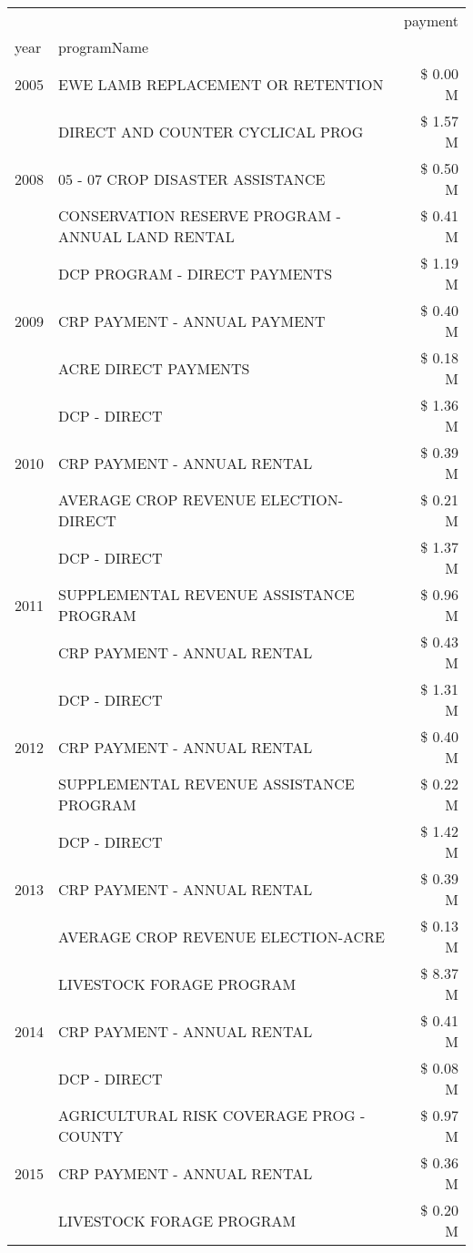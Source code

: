 \begin{tabular}{llr}
\toprule
 &  & payment \\
year & programName &  \\
\midrule
2005 & EWE LAMB REPLACEMENT OR RETENTION & \$ 0.00 M \\
\cline{1-3}
\multirow[t]{3}{*}{2008} & DIRECT AND COUNTER CYCLICAL PROG & \$ 1.57 M \\
 & 05 - 07 CROP DISASTER ASSISTANCE & \$ 0.50 M \\
 & CONSERVATION RESERVE PROGRAM - ANNUAL LAND RENTAL & \$ 0.41 M \\
\cline{1-3}
\multirow[t]{3}{*}{2009} & DCP PROGRAM - DIRECT PAYMENTS & \$ 1.19 M \\
 & CRP PAYMENT - ANNUAL PAYMENT & \$ 0.40 M \\
 & ACRE DIRECT PAYMENTS & \$ 0.18 M \\
\cline{1-3}
\multirow[t]{3}{*}{2010} & DCP - DIRECT & \$ 1.36 M \\
 & CRP PAYMENT - ANNUAL RENTAL & \$ 0.39 M \\
 & AVERAGE CROP REVENUE ELECTION-DIRECT & \$ 0.21 M \\
\cline{1-3}
\multirow[t]{3}{*}{2011} & DCP - DIRECT & \$ 1.37 M \\
 & SUPPLEMENTAL REVENUE ASSISTANCE PROGRAM & \$ 0.96 M \\
 & CRP PAYMENT - ANNUAL RENTAL & \$ 0.43 M \\
\cline{1-3}
\multirow[t]{3}{*}{2012} & DCP - DIRECT & \$ 1.31 M \\
 & CRP PAYMENT - ANNUAL RENTAL & \$ 0.40 M \\
 & SUPPLEMENTAL REVENUE ASSISTANCE PROGRAM & \$ 0.22 M \\
\cline{1-3}
\multirow[t]{3}{*}{2013} & DCP - DIRECT & \$ 1.42 M \\
 & CRP PAYMENT - ANNUAL RENTAL & \$ 0.39 M \\
 & AVERAGE CROP REVENUE ELECTION-ACRE & \$ 0.13 M \\
\cline{1-3}
\multirow[t]{3}{*}{2014} & LIVESTOCK FORAGE PROGRAM & \$ 8.37 M \\
 & CRP PAYMENT - ANNUAL RENTAL & \$ 0.41 M \\
 & DCP - DIRECT & \$ 0.08 M \\
\cline{1-3}
\multirow[t]{3}{*}{2015} & AGRICULTURAL RISK COVERAGE PROG - COUNTY & \$ 0.97 M \\
 & CRP PAYMENT - ANNUAL RENTAL & \$ 0.36 M \\
 & LIVESTOCK FORAGE PROGRAM & \$ 0.20 M \\

\end{tabular}
